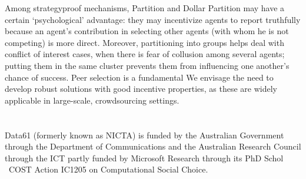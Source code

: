 \documentclass[letterpaper]{article}
\begin{document}
Among strategyproof mechanisms, Partition and Dollar Partition may
have a certain `psychological' advantage: they may incentivize agents to report truthfully because an agent's contribution in selecting other agents (with whom he is not competing) is more direct.
Moreover, partitioning into groups helps deal with conflict of interest cases, when there is fear of collusion among several agents; putting them in the same cluster prevents them from influencing one another's chance of success.
Peer selection is a fundamental   We envisage the need to develop robust solutions with good incentive properties, as these are widely applicable in large-scale, crowdsourcing settings.

\section*{}
Data61 (formerly known as NICTA) is funded by the Australian Government through the Department of Communications and the Australian Research Council through the ICT  partly funded by Microsoft Research through its PhD Schol \ COST Action IC1205 on Computational Social Choice.

\normalsize

\clearpage

\end{document}
